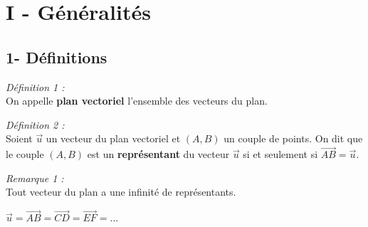 \documentclass{article}
\begin{document}
\begin{center}
    \color{red}
\end{center}

\section*{I - Généralités}
\subsection*{1- Définitions}

\textit{\color{red}Définition 1 :}\\
On appelle \textbf{plan vectoriel} l'ensemble des vecteurs du plan.

\vspace{1.5em}

\textit{\color{red}Définition 2 :}\\
Soient $\vec{u}$ un vecteur du plan vectoriel et $(A, B)$ un couple de points. On dit que le couple $(A, B)$ est un \textbf{représentant} du vecteur $\vec{u}$ si et seulement si $\overrightarrow{AB} = \vec{u}$.

\begin{center}
\end{center}
\textit{\color{red}Remarque 1 :}\\
Tout vecteur du plan a une infinité de représentants.
\begin{center}
    \quad $\vec{u} = \overrightarrow{AB} = \overrightarrow{CD} = \overrightarrow{EF} = ...$
\end{center}
\end{document}

